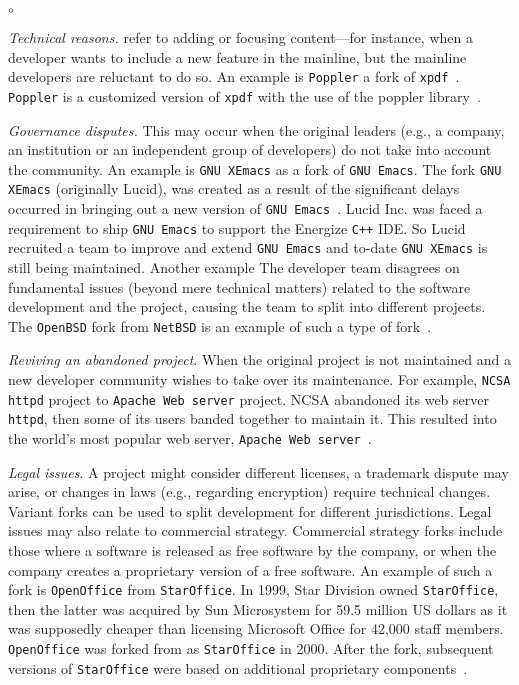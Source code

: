 \begin{list}{$\circ$}{}
   \item \textit{Technical reasons.} refer to adding or focusing content---for instance, when a developer wants to include a new feature in the mainline, but the mainline developers are reluctant to do so. An example is \texttt{Poppler} a fork of \texttt{xpdf}~\cite{Gregorio:2012}. \texttt{Poppler} is a customized version of \texttt{xpdf} with the use of the poppler library~\cite{poppler}.
    
    
    \item \textit{Governance disputes.} This may occur when the original leaders (e.g., a company, an institution or an independent group of developers) do not take into account the community. An example is \texttt{GNU XEmacs} as a fork of \texttt{GNU Emacs}.
    The fork \texttt{GNU XEmacs} (originally Lucid), was created as a result of the significant delays occurred in bringing out a new version of \texttt{GNU Emacs}~\cite{XEmacs}. Lucid Inc. was faced a requirement to ship \texttt{GNU Emacs} to support the Energize \texttt{C++} IDE. So Lucid recruited a team to improve and extend \texttt{GNU Emacs} and to-date \texttt{GNU XEmacs} is still being maintained. Another example The developer team disagrees on fundamental issues (beyond mere technical matters) related to the software development and the project, causing the team to split into different projects. The \texttt{OpenBSD} fork from \texttt{NetBSD} is an example of such a type of fork~\cite{openbsd}.


    \item \textit{Reviving an abandoned project}. When the original project is not maintained and a new developer community wishes to take over its maintenance. For example, \texttt{NCSA httpd} project to \texttt{Apache Web server} project. NCSA abandoned its web server \texttt{httpd}, then some of its users banded together to maintain it. This resulted into the world’s most popular web server, \texttt{Apache Web server}~\cite{Wheeler:2015Forking}.


\item \textit{Legal issues}. A project might consider different licenses, a trademark dispute may arise, or changes in laws (e.g., regarding encryption) require technical changes. Variant forks can be used to split development for different jurisdictions. Legal issues may also relate to commercial strategy. Commercial strategy forks include those where a software is released as free software by the company, or when the company creates a proprietary version of a free software. An example of such a fork is \texttt{OpenOffice} from \texttt{StarOffice}. In 1999, Star Division owned \texttt{StarOffice}, then the latter was acquired by Sun Microsystem for 59.5 million US dollars as it was supposedly cheaper than licensing Microsoft Office for 42,000 staff members. \texttt{OpenOffice} was forked from as \texttt{StarOffice} in 2000. After the fork, subsequent versions of \texttt{StarOffice} were based on additional proprietary components~\cite{Openoffice}.


\end{list}

